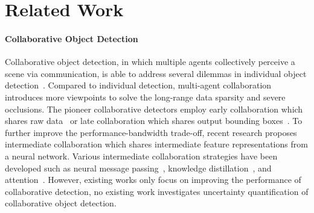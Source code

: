 \section{Related Work}
\label{sec:relatedwork}

\paragraph{Collaborative Object Detection} Collaborative object detection, in which multiple agents collectively perceive a scene via communication, is able to address several dilemmas in individual object detection~\cite{li2022v2x,cai2022analyzing}. Compared to individual detection, multi-agent collaboration introduces more viewpoints to solve the long-range data sparsity and severe occlusions.
The pioneer collaborative detectors employ early collaboration which shares raw data~\cite{Chen2019CooperCP} or late collaboration which shares output bounding boxes~\cite{arnold2020cooperative}. To further improve the performance-bandwidth trade-off, recent research proposes intermediate collaboration which shares intermediate feature representations from a neural network. Various intermediate collaboration strategies have been developed such as neural message passing~\cite{wang2020v2vnet}, knowledge distillation~\cite{li2021learning}, and attention~\cite{xu2022v2x,xu2022bridging}. However, existing works only focus on improving the performance of collaborative detection, no existing work investigates uncertainty quantification of collaborative object detection. 

